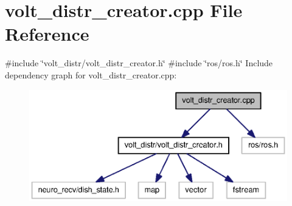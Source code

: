 \section{volt\-\_\-distr\-\_\-creator.\-cpp \-File \-Reference}
\label{volt__distr__creator_8cpp}
{\ttfamily \#include \char`\"{}volt\-\_\-distr/volt\-\_\-distr\-\_\-creator.\-h\char`\"{}}\*
{\ttfamily \#include \char`\"{}ros/ros.\-h\char`\"{}}\*
\-Include dependency graph for volt\-\_\-distr\-\_\-creator.\-cpp\-:
\nopagebreak
\begin{figure}[H]
\begin{center}
\leavevmode
\includegraphics[width=350pt]{volt__distr__creator_8cpp__incl}
\end{center}
\end{figure}

